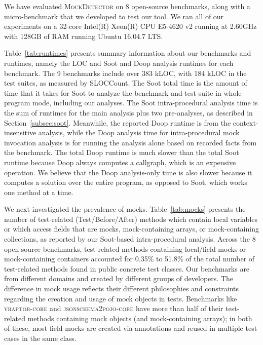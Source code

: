 
We have evaluated \textsc{MockDetector} on 8 open-source benchmarks, along with a micro-benchmark that we developed to test our tool. We ran all of our experiments on a 32-core Intel(R) Xeon(R) CPU E5-4620 v2 running at 2.60GHz with 128GB of RAM running Ubuntu 16.04.7 LTS.

Table~\ref{tab:runtimes} presents summary information about our benchmarks and runtimes, namely the LOC and Soot and Doop analysis runtimes for each benchmark. The 9 benchmarks include over 383 kLOC, with 184 kLOC in the test suites, as measured by SLOCCount. The Soot total time is the amount of time that it takes for Soot to analyze the benchmark and test suite in whole-program mode, including our analyses. The Soot intra-procedural analysis time is the sum of runtimes for the main analysis plus two pre-analyses, as described in Section~\ref{subsec:soot}. Meanwhile, the reported Doop runtime is from the context-insensitive analysis, while the Doop analysis time for intra-procedural mock invocation analysis is for running the analysis alone based on recorded facts from the benchmark. The total Doop runtime is much slower than the total Soot runtime because Doop always computes a callgraph, which is an expensive operation. We believe that the Doop analysis-only time is also slower because it computes a solution over the entire program, as opposed to Soot, which works one method at a time.

We next investigated the prevalence of mocks. Table~\ref{tab:mocks} presents the number of test-related (Test/Before/After) methods which contain local variables or which access fields that are mocks, mock-containing arrays, or mock-containing collections, as reported by our Soot-based intra-procedural analysis. Across the 8 open-source benchmarks, test-related methods containing local/field mocks or mock-containing containers accounted for 0.35\% to 51.8\% of the total number of test-related methods found in public concrete test classes. Our benchmarks are from different domains and created by different groups of developers. The difference in mock usage reflects their different philosophies and constraints regarding the creation and usage of mock objects in tests. Benchmarks like \textsc{vraptor-core} and \textsc{jsonschema2pojo-core} have more than half of their test-related methods containing mock objects (and mock-containing arrays); in both of these, most field mocks are created via annotations and reused in multiple test cases in the same class.

